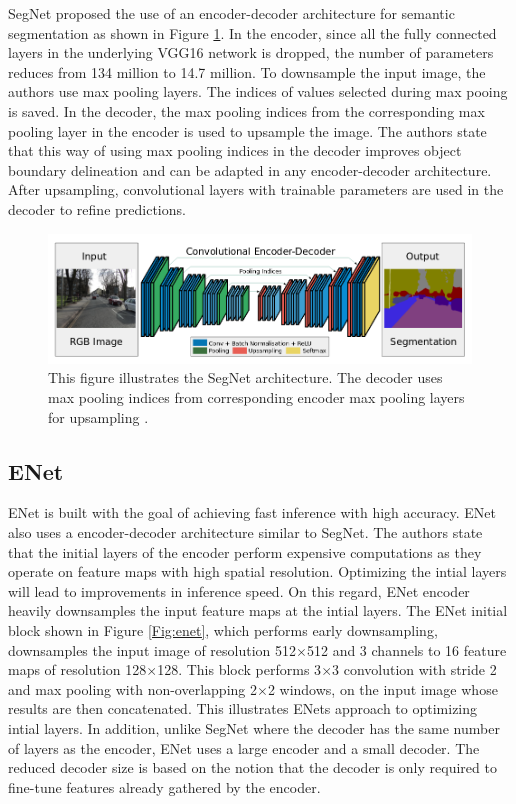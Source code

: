 SegNet \cite{DBLP:journals/corr/BadrinarayananK15} proposed the use of an encoder-decoder architecture for semantic segmentation as shown in Figure \ref{Fig:segnet}. In the encoder, since all the fully connected layers in the underlying VGG16 network is dropped, the number of parameters reduces from 134 million to 14.7 million. To downsample the input image, the authors use max pooling layers. The indices of values selected during max pooing is saved. In the decoder, the max pooling indices from the corresponding max pooling layer in the encoder is used to upsample the image. The authors state that this way of using max pooling indices in the decoder improves object boundary delineation and can be adapted in any encoder-decoder architecture. After upsampling, convolutional layers with trainable parameters are used in the decoder to refine predictions. 

	\begin{figure}
		\centering
		\includegraphics[width=1\linewidth]{images/segnet}
		\caption{This figure illustrates the SegNet architecture. The decoder uses max pooling indices from corresponding encoder max pooling layers for upsampling \cite{DBLP:journals/corr/BadrinarayananK15}.}
		\label{Fig:segnet}
	\end{figure}

\subsection{ENet}

ENet \cite{DBLP:journals/corr/PaszkeCKC16} is built with the goal of achieving fast inference with high accuracy. ENet also uses a encoder-decoder architecture similar to SegNet. The authors state that the initial layers of the encoder perform expensive computations as they operate on feature maps with high spatial resolution. Optimizing the intial layers will lead to improvements in inference speed. On this regard, ENet encoder heavily downsamples the input feature maps at the intial layers. The ENet initial block shown in Figure \ref{Fig:enet}, which performs early downsampling, downsamples the input image of resolution 512$\times$512 and 3 channels to 16 feature maps of resolution 128$\times$128. This block performs 3$\times$3 convolution with stride 2 and max pooling with non-overlapping 2$\times$2 windows, on the input image whose results are then concatenated. This illustrates ENets approach to optimizing intial layers. In addition, unlike SegNet where the decoder has the same number of layers as the encoder, ENet uses a large encoder and a small decoder. The reduced decoder size is based on the notion that the decoder is only required to fine-tune features already gathered by the encoder. 

